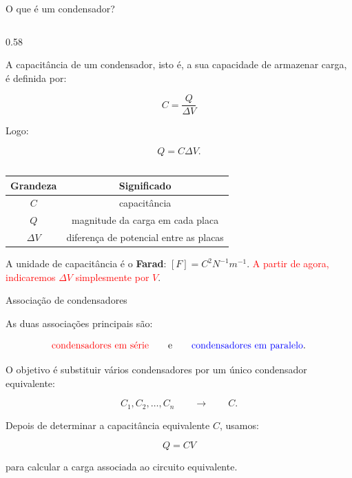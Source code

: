 \documentclass{beamer}
\begin{document}
\begin{frame}{O que é um condensador?}
\begin{columns}[T]
\begin{column}{0.58\textwidth}
				\vspace{0.15cm}
				
				A capacitância de um condensador, isto é, a sua capacidade de armazenar carga,
				é definida por:
				
				\[
				C=\frac{Q}{\Delta V}
				\]
				
				Logo:
				
				\[
				Q=C\Delta V.
				\]
			\end{column}
			
		\end{columns}
		
		\vspace{0.1cm}
		
		{\tiny
			
			\begin{center}
			\begin{tabular}{c|c}
				Grandeza & Significado \\ \hline
				\(C\) & capacitância \\
				\(Q\) & magnitude da carga em cada placa \\
				\(\Delta V\) & diferença de potencial entre as placas
			\end{tabular}
		\end{center}}
		
		\vspace{0.05cm}
		
		A unidade de capacitância é o \textbf{Farad}: \([F]=C^2N^{-1}m^{-1}\). \textcolor{red}{A partir de agora, indicaremos \(\Delta V\) simplesmente por \(V\)}.
		
	\end{frame}
	
	\begin{frame}{Associação de condensadores}
		\scriptsize
		
		As duas associações principais são:
		
		\[
		\textcolor{red}{\text{condensadores em série}}
		\qquad
		\text{e}
		\qquad
		\textcolor{blue}{\text{condensadores em paralelo}}.
		\]
		
		O objetivo é substituir vários condensadores por um único condensador equivalente:
		
		\[
		C_1,C_2,\ldots,C_n
		\qquad
		\longrightarrow
		\qquad
		C.
		\]
		
		Depois de determinar a capacitância equivalente \(C\), usamos:
		
		\[
		Q=CV
		\]
		
		para calcular a carga associada ao circuito equivalente.
	\end{frame}
	
\end{document}
